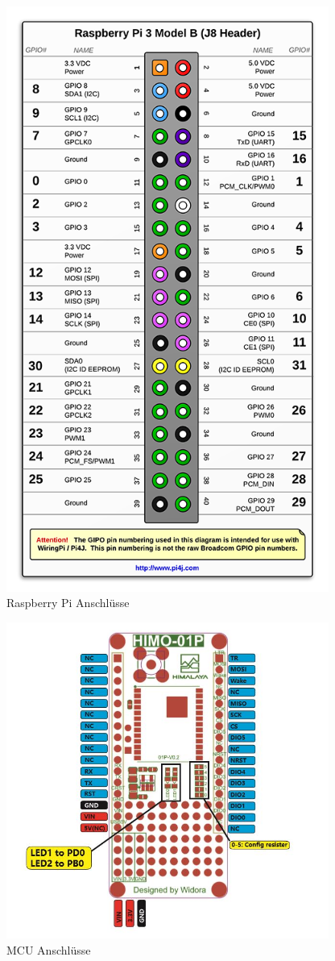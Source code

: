 \documentclass[12pt, a4paper]{article}
\begin{document}
\newpage
\begin{figure}[ht!]
    \centering
    \includegraphics[width=300pt]{j8header}
    \caption{Raspberry Pi Anschlüsse}
\end{figure}
\begin{figure}[ht!]
    \centering
    \includegraphics[width=300pt]{mcu}
    \caption{MCU Anschlüsse}
\end{figure}
\end{document}
